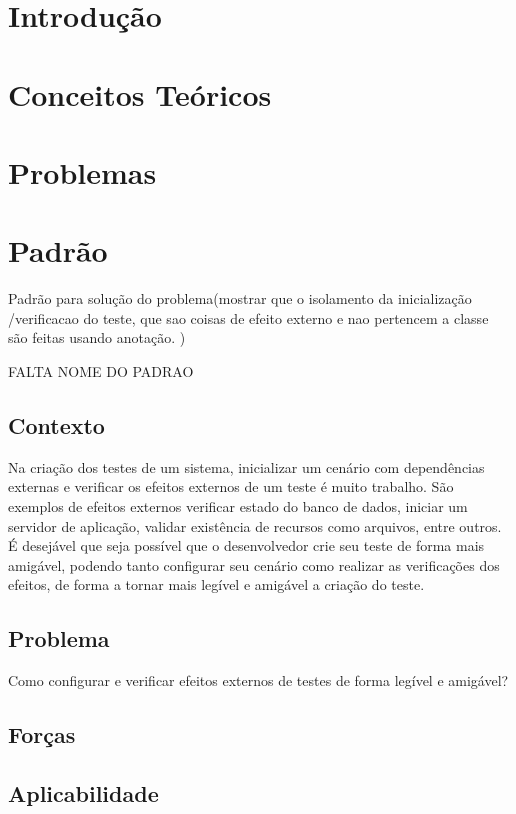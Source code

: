 \documentclass[12pt,a4paper,oneside]{book}
\begin{document}


\chapter{Introdução}

\chapter{Conceitos Teóricos}

\chapter{Problemas}


\chapter{Padrão}

Padrão para solução do problema(mostrar que o isolamento da inicialização /verificacao do teste, que sao coisas de efeito externo e nao pertencem a classe são feitas  usando anotação. )

FALTA NOME DO PADRAO

\section{Contexto}
Na criação dos testes de um sistema, inicializar um cenário com dependências externas e verificar os efeitos externos de um teste é muito trabalho. São exemplos de efeitos externos verificar estado do banco de dados, iniciar um servidor de aplicação, validar existência de recursos como arquivos, entre outros. É desejável que seja possível que o desenvolvedor crie seu teste de forma mais amigável, podendo tanto configurar seu cenário como realizar as verificações dos efeitos, de forma a tornar mais legível e amigável a criação do teste.

\section{Problema}
Como configurar e verificar efeitos externos de testes de forma legível e amigável?

\section{Forças}

\section{Aplicabilidade}
\end{document}
